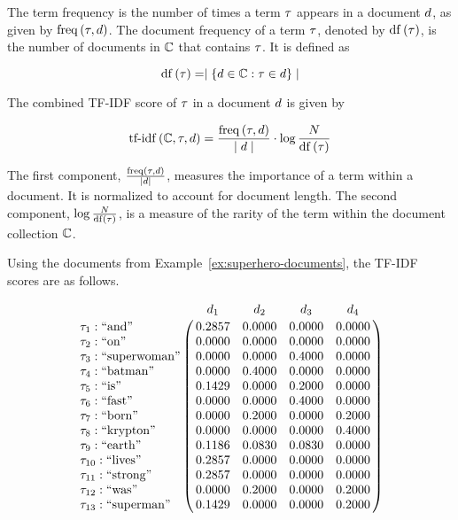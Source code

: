		\begin{defn}
			The term frequency is the number of times a term $\tau$ appears in a document $d$, as given by $\operatorname{freq}\left(\tau, d\right)$.  The document frequency of a term $\tau$, denoted by $\operatorname{df}\left(\tau\right)$, is the number of documents in $\mathbb{C}$ that contains $\tau$.  It is defined as
			
			$$\operatorname{df}\left(\tau\right) = \mid \left\{d \in \mathbb{C}: \tau \in d\right\} \mid$$
			
			The combined TF-IDF score of $\tau$ in a document $d$ is given by
			
			$$\operatorname{tf-idf}\left(\mathbb{C}, \tau, d\right) = \frac{\operatorname{freq}\left(\tau, d\right)}{\mid d \mid} \cdot \log{\frac{N}{\operatorname{df}\left(\ensuremath \tau\right)}}$$
		\end{defn}
		
		\begin{remark}
			The first component, $\frac{\operatorname{freq}\left(\tau, d\right)}{\mid d \mid}$, measures the importance of a term within a document.  It is normalized to account for document length.  The second component, $\log{\frac{N}{\operatorname{df}\left(\ensuremath \tau\right)}}$, is a measure of the rarity of the term within the document collection $\mathbb{C}$.
		\end{remark}
		
		\begin{ex}
			Using the documents from Example~\ref{ex:superhero-documents}, the TF-IDF scores are as follows.
			
			$$\bordermatrix{
				~ & \doc_1 & \doc_2 & \doc_3 & \doc_4 \cr
				\term_1 : \textrm{``and''} & 0.2857 & 0.0000 & 0.0000 & 0.0000 \cr
				\term_2 : \textrm{``on''} & 0.0000 & 0.0000 & 0.0000 & 0.0000 \cr
				\term_3 : \textrm{``superwoman''} & 0.0000 & 0.0000 & 0.4000 & 0.0000 \cr
				\term_4 : \textrm{``batman''} & 0.0000 & 0.4000 & 0.0000 & 0.0000 \cr
				\term_5 : \textrm{``is''} & 0.1429 & 0.0000 & 0.2000 & 0.0000 \cr
				\term_6 : \textrm{``fast''} & 0.0000 & 0.0000 & 0.4000 & 0.0000 \cr
				\term_7 : \textrm{``born''} & 0.0000 & 0.2000 & 0.0000 & 0.2000 \cr
				\term_8 : \textrm{``krypton''} & 0.0000 & 0.0000 & 0.0000 & 0.4000 \cr
				\term_9 : \textrm{``earth''} & 0.1186 & 0.0830 & 0.0830 & 0.0000 \cr
				\term_{10} : \textrm{``lives''} & 0.2857 & 0.0000 & 0.0000 & 0.0000 \cr
				\term_{11} : \textrm{``strong''} & 0.2857 & 0.0000 & 0.0000 & 0.0000 \cr
				\term_{12} : \textrm{``was''} & 0.0000 & 0.2000 & 0.0000 & 0.2000 \cr
				\term_{13} : \textrm{``superman''} & 0.1429 & 0.0000 & 0.0000 & 0.2000 \cr
			}$$
		\end{ex}


